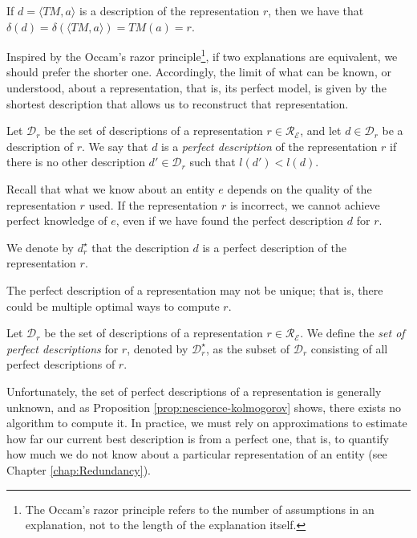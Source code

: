 If $d = \langle TM, a \rangle$ is a description of the representation $r$, then we have that $\delta \left( d \right) = \delta \left( \langle TM, a \rangle \right) = TM(a) = r$.

Inspired by the Occam's razor principle\footnote{The Occam's razor principle refers to the number of assumptions in an explanation, not to the length of the explanation itself.}, if two explanations are equivalent, we should prefer the shorter one. Accordingly, the limit of what can be known, or understood, about a representation, that is, its perfect model, is given by the shortest description that allows us to reconstruct that representation.

\begin{definition}
\label{def:descriptions_perfect_model}
Let $\mathcal{D}_r$ be the set of descriptions of a representation $r \in \mathcal{R}_\mathcal{E}$, and let $d \in \mathcal{D}_r$ be a description of $r$. We say that $d$ is a \emph{perfect description} of the representation $r$ if there is no other description $d' \in\mathcal{D}_r$ such that $l(d') < l(d)$.
\end{definition}

Recall that what we know about an entity $e$ depends on the quality of the representation $r$ used. If the representation $r$ is incorrect, we cannot achieve perfect knowledge of $e$, even if we have found the perfect description $d$ for $r$.

\begin{notation}
We denote by $d_r^{\star}$ that the description $d$ is a perfect description of the representation $r$.
\end{notation}

The perfect description of a representation may not be unique; that is, there could be multiple optimal ways to compute $r$.

\begin{definition}
\label{def:set_descriptions_perfect_model}
Let $\mathcal{D}_r$ be the set of descriptions of a representation $r \in \mathcal{R}_\mathcal{E}$. We define the \emph{set of perfect descriptions} for $r$, denoted by $\mathcal{D}^\star_r$, as the subset of $\mathcal{D}_r$ consisting of all perfect descriptions of $r$.
\end{definition}

Unfortunately, the set of perfect descriptions of a representation is generally unknown, and as Proposition \ref{prop:nescience-kolmogorov} shows, there exists no algorithm to compute it. In practice, we must rely on approximations to estimate how far our current best description is from a perfect one, that is, to quantify how much we do not know about a particular representation of an entity (see Chapter \ref{chap:Redundancy}).


